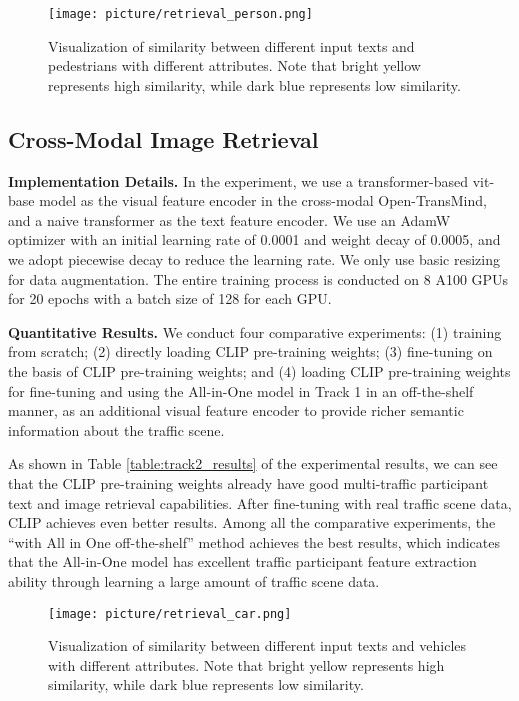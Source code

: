 \documentclass[10pt,twocolumn,letterpaper]{article}
\begin{document}
\begin{figure}[t]
  \centering
\texttt{[image: picture/retrieval\_person.png]}
   \caption{Visualization of similarity between different input texts and pedestrians with different attributes. Note that bright yellow represents high similarity, while dark blue represents low similarity.}
   \label{fig:retrieval_person}
\end{figure}


\subsection{Cross-Modal Image Retrieval}
\textbf{Implementation Details.} In the experiment, we use a transformer-based vit-base model as the visual feature encoder in the cross-modal Open-TransMind, and a naive transformer as the text feature encoder. We use an AdamW optimizer with an initial learning rate of 0.0001 and weight decay of 0.0005, and we adopt piecewise decay to reduce the learning rate. We only use basic resizing for data augmentation. The entire training process is conducted on 8 A100 GPUs for 20 epochs with a batch size of 128 for each GPU.

\textbf{Quantitative Results.} We conduct four comparative experiments: (1) training from scratch; (2) directly loading CLIP pre-training weights; (3) fine-tuning on the basis of CLIP pre-training weights; and (4) loading CLIP pre-training weights for fine-tuning and using the All-in-One model in Track 1 in an off-the-shelf manner, as an additional visual feature encoder to provide richer semantic information about the traffic scene.

As shown in Table \ref{table:track2_results} of the experimental results, we can see that the CLIP pre-training weights already have good multi-traffic participant text and image retrieval capabilities. After fine-tuning with real traffic scene data, CLIP achieves even better results. Among all the comparative experiments, the ``with All in One off-the-shelf'' method achieves the best results, which indicates that the All-in-One model has excellent traffic participant feature extraction ability through learning a large amount of traffic scene data.


\begin{figure}[t]
  \centering
\texttt{[image: picture/retrieval\_car.png]}
   \caption{Visualization of similarity between different input texts and vehicles with different attributes. Note that bright yellow represents high similarity, while dark blue represents low similarity.}
   \label{fig:retrieval_car}
\end{figure}
\end{document}
